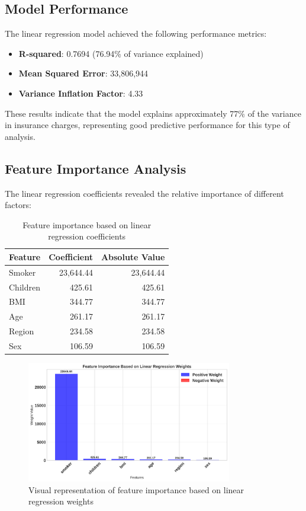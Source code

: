 \documentclass[12pt,a4paper]{article}
\begin{document}
\subsection{Model Performance}

The linear regression model achieved the following performance metrics:
\begin{itemize}
    \item \textbf{R-squared}: 0.7694 (76.94\% of variance explained)
    \item \textbf{Mean Squared Error}: 33,806,944
    \item \textbf{Variance Inflation Factor}: 4.33
\end{itemize}

These results indicate that the model explains approximately 77\% of the variance in insurance charges, representing good predictive performance for this type of analysis.

\subsection{Feature Importance Analysis}

The linear regression coefficients revealed the relative importance of different factors:

\begin{table}[H]
\centering
\begin{tabular}{lrr}
\toprule
\textbf{Feature} & \textbf{Coefficient} & \textbf{Absolute Value} \\
\midrule
Smoker & 23,644.44 & 23,644.44 \\
Children & 425.61 & 425.61 \\
BMI & 344.77 & 344.77 \\
Age & 261.17 & 261.17 \\
Region & 234.58 & 234.58 \\
Sex & 106.59 & 106.59 \\
\bottomrule
\end{tabular}
\caption{Feature importance based on linear regression coefficients}
\end{table}

\begin{figure}[H]
\centering
\includegraphics[width=0.8\textwidth]{feature_importance_weights.png}
\caption{Visual representation of feature importance based on linear regression weights}
\label{fig:feature_importance_weights}
\end{figure}
\end{document}
